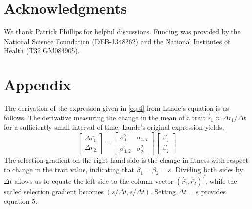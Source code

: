 \documentclass[9pt,twocolumn,twoside]{gsajnl}
\begin{document}
\section*{Acknowledgments}
\label{sec:acknowledgments}
We thank Patrick Phillips for helpful discussions. Funding was provided by the National Science Foundation (DEB-1348262) and the National Institutes of Health (T32 GM084905).


\section*{Appendix}
The derivation of the expression given in \ref{eq:4} from Lande's equation is as follows. The derivative measuring the change in the mean of a trait $\dot{\bar{r_1}} \approx \Delta \bar{r_1}/\Delta t$ for a sufficiently small interval of time. Lande's original expression yields,
\[
\left[
\begin{array}{c}
\Delta \bar{r_1} \\
\Delta \bar{r_2} 
\end{array}
\right]
=
\left[
\begin{array}{cc}
\sigma_1^2 & \sigma_{1,2} \\
\sigma_{1,2} & \sigma_2^2 
\end{array}
\right]
\left[
\begin{array}{c}
\beta_1 \\
\beta_2 
\end{array}
\right]
\]
The selection gradient on the right hand side is the change in fitness with respect to change in the trait value, indicating that $\beta_1=\beta_2=s$. Dividing both sides by $\Delta t$ allows us to equate the left side to the column vector $(\dot{\bar{r_1}},\dot{\bar{r_2}})^T$, while the scaled selection gradient becomes $(s/\Delta t,s/\Delta t)$. Setting $\Delta t = s$ provides equation 5.   
\end{document}

